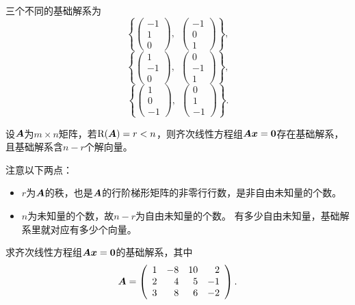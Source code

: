 \begin{frame}
\begin{jie}[续]
三个不同的基础解系为
$$
\left\{
  \left(
    \begin{array}{r}
      -1\\1\\0
    \end{array}
  \right),~~
  \left(
    \begin{array}{r}
      -1\\0\\1
    \end{array}
  \right)
\right\},
$$
$$
\left\{
  \left(
    \begin{array}{r}
      1\\-1\\0
    \end{array}
  \right),~~
  \left(
    \begin{array}{r}
      0\\-1\\1
    \end{array}
  \right)
\right\},
$$
$$
\left\{
  \left(
    \begin{array}{r}
      1\\0\\-1
    \end{array}
  \right),~~
  \left(
    \begin{array}{r}
      0\\1\\-1
    \end{array}
  \right)
\right\}.
$$
\end{jie}
\end{frame}


\begin{frame}
\begin{dingli}
  设$\boldsymbol{A}$为$m\times n$矩阵，若$\mathrm{R}(\boldsymbol{A})=r<n$，则齐次线性方程组$\boldsymbol{A}{\boldsymbol{x}}=\boldsymbol{0}$存在基础解系，
  且基础解系含$n-r$个解向量。
\end{dingli}

\begin{zhu*}
  注意以下两点：
  \begin{itemize}
  \item $r$为$\boldsymbol{A}$的秩，也是$\boldsymbol{A}$的行阶梯形矩阵的非零行行数，是非自由未知量的个数。 
  \item $n$为未知量的个数，故$n-r$为自由未知量的个数。 有多少自由未知量，基础解系里就对应有多少个向量。
  \end{itemize}
\end{zhu*}
\end{frame}

\begin{frame}[allowframebreaks]
\begin{li}
  求齐次线性方程组$\boldsymbol{A}{\boldsymbol{x}}=\boldsymbol{0}$的基础解系，其中
  $$
  \boldsymbol{A} = \left(
    \begin{array}{rrrr}
      1&-8&10&2\\
      2&4&5&-1\\
      3&8&6&-2
    \end{array}
  \right).
  $$
\end{li} 
\end{frame}


